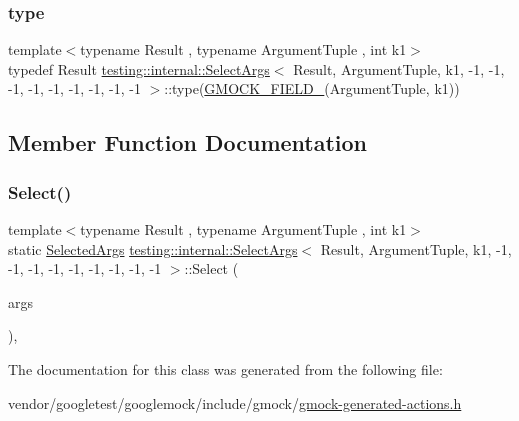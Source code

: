 \subsubsection{\texorpdfstring{type}{type}}
{\footnotesize\ttfamily template$<$typename Result , typename Argument\+Tuple , int k1$>$ \\
typedef Result \hyperlink{classtesting_1_1internal_1_1_select_args}{testing\+::internal\+::\+Select\+Args}$<$ Result, Argument\+Tuple, k1, -\/1, -\/1, -\/1, -\/1, -\/1, -\/1, -\/1, -\/1, -\/1 $>$\+::type(\hyperlink{gmock-generated-actions_8h_a6eb3ce92b0613603057a20ec9e593317}{G\+M\+O\+C\+K\+\_\+\+F\+I\+E\+L\+D\+\_\+}(Argument\+Tuple, k1))}



\subsection{Member Function Documentation}
\mbox{\label{classtesting_1_1internal_1_1_select_args_3_01_result_00_01_argument_tuple_00_01k1_00_01-1_00_01-33116bd77067572e384b90e7c70b03c4_a7aaf6f5192da4e05fbc2bf595418546b}} 
\subsubsection{\texorpdfstring{Select()}{Select()}}
{\footnotesize\ttfamily template$<$typename Result , typename Argument\+Tuple , int k1$>$ \\
static \hyperlink{classtesting_1_1internal_1_1_select_args_3_01_result_00_01_argument_tuple_00_01k1_00_01-1_00_01-33116bd77067572e384b90e7c70b03c4_a40e5cbd362d7bdd16d0d60a39b7e5c14}{Selected\+Args} \hyperlink{classtesting_1_1internal_1_1_select_args}{testing\+::internal\+::\+Select\+Args}$<$ Result, Argument\+Tuple, k1, -\/1, -\/1, -\/1, -\/1, -\/1, -\/1, -\/1, -\/1, -\/1 $>$\+::Select (\begin{DoxyParamCaption}\item[{const Argument\+Tuple \&}]{args }\end{DoxyParamCaption})\hspace{0.3cm}{\ttfamily [inline]}, {\ttfamily [static]}}



The documentation for this class was generated from the following file\+:\begin{DoxyCompactItemize}
\item 
vendor/googletest/googlemock/include/gmock/\hyperlink{gmock-generated-actions_8h}{gmock-\/generated-\/actions.\+h}\end{DoxyCompactItemize}
